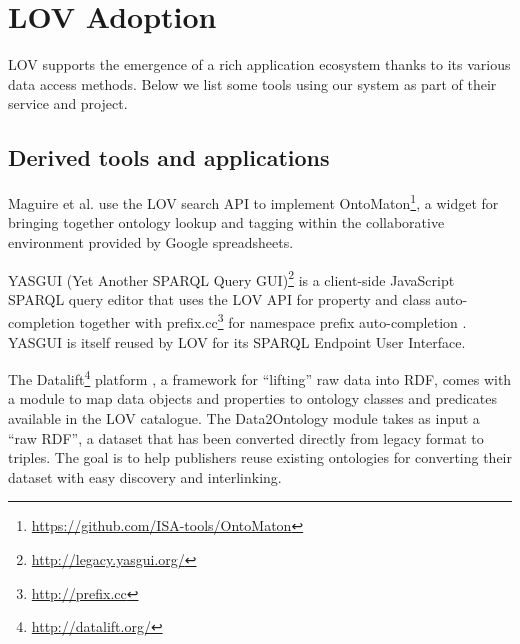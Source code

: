 \documentclass{iosart2c}
\begin{document}

\section{LOV Adoption}
\label{sec:lovecosystem}
LOV supports the emergence of a rich application ecosystem thanks to its various data access methods. Below we list some tools using our system as part of their service and project.
 
\subsection{Derived tools and applications}

Maguire et al. \cite{ontomaton12} use the LOV search API to implement OntoMaton\footnote{\url{https://github.com/ISA-tools/OntoMaton}}, a widget for bringing together ontology lookup and tagging within the collaborative environment provided by Google spreadsheets. 

YASGUI (Yet Another SPARQL Query GUI)\footnote{\url{http://legacy.yasgui.org/}} is a client-side JavaScript SPARQL query editor that uses the LOV API for property and class auto-completion together with prefix.cc\footnote{\url{http://prefix.cc}} for namespace prefix auto-completion \cite{yasgui}. YASGUI is itself reused by LOV for its SPARQL Endpoint User Interface.

The Datalift\footnote{\url{http://datalift.org/}} platform \cite{scharffe_2012}, a framework for ``lifting'' raw data into RDF, comes with a module to map data objects and properties to ontology classes and predicates available in the LOV catalogue. The Data2Ontology module takes as input a ``raw RDF'', a dataset that has been converted directly from legacy format to triples. The goal is to help publishers reuse existing ontologies for converting their dataset with easy discovery and interlinking. 
\end{document}
